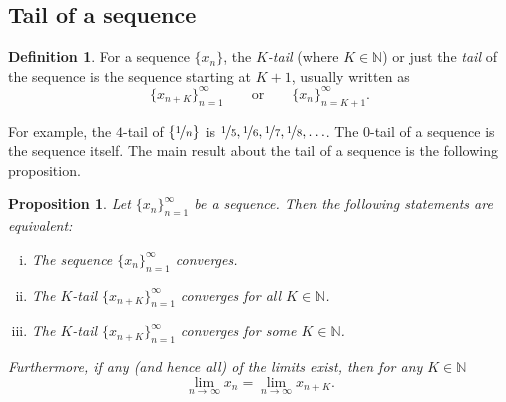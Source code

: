 \documentclass[12pt]{book}
\newcommand{\N}{{\mathbb{N}}}
\theoremstyle{plain}
\newtheorem{prop}[thm]{Proposition}
\theoremstyle{remark}
\theoremstyle{definition}
\newtheorem{defn}[thm]{Definition}
\theoremstyle{exercise}
\theoremstyle{example}
\begin{document}
\subsection{Tail of a sequence}

\begin{defn}
For a sequence $\{ x_n \}$,
the \emph{$K$-tail} (where $K \in \N$)
or just the
\emph{tail} of
the sequence is the sequence starting at $K+1$, usually written as
\begin{equation*}
\{ x_{n+K} \}_{n=1}^\infty
\qquad \text{or} \qquad \{ x_n \}_{n=K+1}^\infty .
\end{equation*}
\end{defn}
For example, the $4$-tail of $\{ \nicefrac{1}{n} \}$ is
$\nicefrac{1}{5}, \nicefrac{1}{6}, \nicefrac{1}{7}, \nicefrac{1}{8},
\ldots$.  The $0$-tail of a sequence is the sequence itself.
The main result about the tail of a sequence is the following proposition.

\begin{prop}
Let $\{ x_n \}_{n=1}^\infty$ be a sequence.  Then the following
statements are equivalent:
\begin{enumerate}[(i)]
\item \label{prop:ktail:i}
The sequence $\{ x_n \}_{n=1}^\infty$ converges.
\item \label{prop:ktail:ii}
The $K$-tail $\{ x_{n+K} \}_{n=1}^\infty$ converges for all $K \in \N$.
\item \label{prop:ktail:iii}
The $K$-tail $\{ x_{n+K} \}_{n=1}^\infty$ converges for some $K \in \N$.
\end{enumerate}
Furthermore, if any (and hence all) of the limits exist, then for any $K \in \N$
\begin{equation*}
\lim_{n\to \infty} x_n = \lim_{n \to \infty} x_{n+K} .
\end{equation*}
\end{prop}
\end{document}
